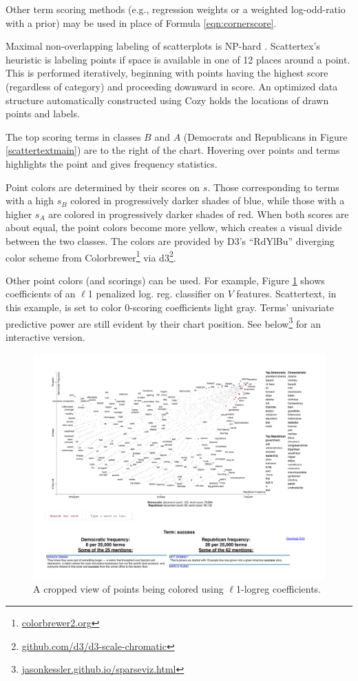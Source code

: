 \documentclass[11pt,a4paper]{article}
\begin{document}
Other term scoring methods (e.g., regression weights or a weighted log-odd-ratio with a prior) may be used in place of Formula \ref{eqn:cornerscore}.

Maximal non-overlapping labeling of scatterplots is NP-hard \cite{Been2007}. Scattertex's heuristic is labeling points if space is available in one of 12 places around a point.  This is performed iteratively, beginning with points having the highest score (regardless of category) and proceeding downward in score.  An optimized data structure automatically constructed using Cozy \cite{cozy} holds the locations of drawn points and labels. 

The top scoring terms in classes $B$ and $A$ (Democrats and Republicans in Figure \ref{scattertextmain}) are to the right of the chart.  Hovering over points and terms highlights the point and gives frequency statistics.

Point colors are determined by their scores on $s$.  Those corresponding to terms with a high $s_B$ colored in progressively darker shades of blue, while those with a higher $s_A$ are colored in progressively darker shades of red.  When both scores are about equal, the point colors become more yellow, which creates a visual divide between the two classes.   The colors are provided by D3's ``RdYlBu'' diverging color scheme from Colorbrewer\footnote{\href{http://colorbrewer2.org/}{colorbrewer2.org}} via d3\footnote{\href{https://github.com/d3/d3-scale-chromatic}{github.com/d3/d3-scale-chromatic}}.

Other point colors (and scorings) can be used.  For example, Figure \ref{scattertextsparse} shows coefficients of an $\ell$1 penalized log. reg. classifier on $V$ features.  Scattertext, in this example, is set to color 0-scoring coefficients light gray.  Terms' univariate predictive power are still evident by their chart position.  See below\footnote{
\href{https://jasonkessler.github.io/sparseviz.html}{jasonkessler.github.io/sparseviz.html}} for an interactive version.
\begin{figure}[h]
  \includegraphics[width=\linewidth]{sparse_crop}
  \caption{A cropped view of points being colored using $\ell$1-logreg coefficients.}
  \label{scattertextsparse}
\end{figure}
\end{document}
